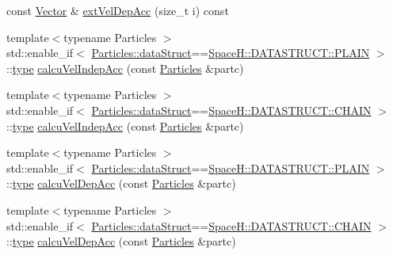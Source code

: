 \begin{DoxyCompactItemize}
\item 
const \mbox{\hyperlink{class_space_h_1_1_interactions_aaebe228fb44635e85cdb8cc9c10d30d1}{Vector}} \& \mbox{\hyperlink{class_space_h_1_1_interactions_a9718af3e96323a7141f0c11e0d86b138}{ext\+Vel\+Dep\+Acc}} (size\+\_\+t i) const
\item 
{\footnotesize template$<$typename Particles $>$ }\\std\+::enable\+\_\+if$<$ \mbox{\hyperlink{class_space_h_1_1_vel_indep_particles_a066cbb08e0d444c27e2f71c30092e13f}{Particles\+::data\+Struct}}==\mbox{\hyperlink{namespace_space_h_a4782f089179a3c269891f02482b072dfaf62eb0bf5e5c72e80983fbbac1cb70e5}{Space\+H\+::\+D\+A\+T\+A\+S\+T\+R\+U\+C\+T\+::\+P\+L\+A\+IN}} $>$\+::\mbox{\hyperlink{class_space_h_1_1_interactions_aa45fc9367bfa0b8693700525ffa2655f}{type}} \mbox{\hyperlink{class_space_h_1_1_interactions_a648a2de8140f2f29fc9599fe8aed3b60}{calcu\+Vel\+Indep\+Acc}} (const \mbox{\hyperlink{struct_space_h_1_1_particles}{Particles}} \&partc)
\item 
{\footnotesize template$<$typename Particles $>$ }\\std\+::enable\+\_\+if$<$ \mbox{\hyperlink{class_space_h_1_1_vel_indep_particles_a066cbb08e0d444c27e2f71c30092e13f}{Particles\+::data\+Struct}}==\mbox{\hyperlink{namespace_space_h_a4782f089179a3c269891f02482b072dfa014d2cf3cdc3af6f4f92c09190860e33}{Space\+H\+::\+D\+A\+T\+A\+S\+T\+R\+U\+C\+T\+::\+C\+H\+A\+IN}} $>$\+::\mbox{\hyperlink{class_space_h_1_1_interactions_aa45fc9367bfa0b8693700525ffa2655f}{type}} \mbox{\hyperlink{class_space_h_1_1_interactions_a80aac6bfbb89e22788cff413ee62db1c}{calcu\+Vel\+Indep\+Acc}} (const \mbox{\hyperlink{struct_space_h_1_1_particles}{Particles}} \&partc)
\item 
{\footnotesize template$<$typename Particles $>$ }\\std\+::enable\+\_\+if$<$ \mbox{\hyperlink{class_space_h_1_1_vel_indep_particles_a066cbb08e0d444c27e2f71c30092e13f}{Particles\+::data\+Struct}}==\mbox{\hyperlink{namespace_space_h_a4782f089179a3c269891f02482b072dfaf62eb0bf5e5c72e80983fbbac1cb70e5}{Space\+H\+::\+D\+A\+T\+A\+S\+T\+R\+U\+C\+T\+::\+P\+L\+A\+IN}} $>$\+::\mbox{\hyperlink{class_space_h_1_1_interactions_aa45fc9367bfa0b8693700525ffa2655f}{type}} \mbox{\hyperlink{class_space_h_1_1_interactions_abe696c7b0b263c1f86af6e2b131777fc}{calcu\+Vel\+Dep\+Acc}} (const \mbox{\hyperlink{struct_space_h_1_1_particles}{Particles}} \&partc)
\item 
{\footnotesize template$<$typename Particles $>$ }\\std\+::enable\+\_\+if$<$ \mbox{\hyperlink{class_space_h_1_1_vel_indep_particles_a066cbb08e0d444c27e2f71c30092e13f}{Particles\+::data\+Struct}}==\mbox{\hyperlink{namespace_space_h_a4782f089179a3c269891f02482b072dfa014d2cf3cdc3af6f4f92c09190860e33}{Space\+H\+::\+D\+A\+T\+A\+S\+T\+R\+U\+C\+T\+::\+C\+H\+A\+IN}} $>$\+::\mbox{\hyperlink{class_space_h_1_1_interactions_aa45fc9367bfa0b8693700525ffa2655f}{type}} \mbox{\hyperlink{class_space_h_1_1_interactions_aedfdfea7ed97d4ee203b8779ae58b202}{calcu\+Vel\+Dep\+Acc}} (const \mbox{\hyperlink{struct_space_h_1_1_particles}{Particles}} \&partc)

\end{DoxyCompactItemize}
